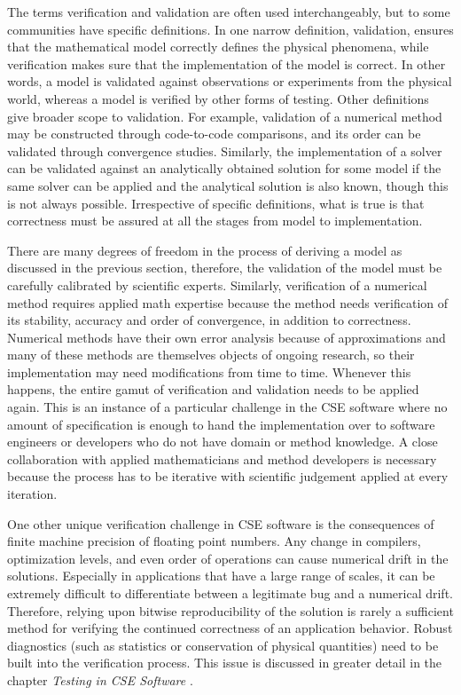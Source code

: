 The terms verification and
validation are often used interchangeably, but to some communities have specific definitions.  
In one narrow definition, validation, ensures that the
mathematical model correctly defines the physical phenomena, while
verification makes sure that the implementation of the model is
correct. In other words, a model is validated against observations or
experiments from the physical world, whereas a model is verified by
other forms of testing.   Other definitions give broader scope to 
validation. For example, validation of a numerical
method may be constructed through code-to-code comparisons, and its
order can be validated through convergence studies. Similarly, the
implementation of a solver can be validated against an analytically
obtained solution for some model if the same solver can be
applied and the analytical solution is also known, though this is not
always possible.  Irrespective of  specific definitions, what is true is that
correctness must be assured at all the stages from model to
implementation.  

There are many degrees of freedom in the process of deriving a
model as discussed in the previous section, therefore, the validation of the
model must be carefully calibrated by scientific experts. Similarly,
verification of a numerical method requires applied math expertise
because the method needs verification of its stability, accuracy and
order of convergence, in addition to correctness. Numerical methods
have their own error analysis because of approximations and many of
these methods are themselves objects of ongoing research, so their
implementation may need modifications from time to time. Whenever
this happens, the entire gamut of verification and validation needs to
be applied again. This is an instance of a particular challenge in the
CSE software where no amount of specification is enough to hand the
implementation over to software engineers or developers who do not have domain or method knowledge. A close
collaboration with applied mathematicians and method developers is necessary because the process has to be iterative with
scientific judgement applied at every iteration. 

One other unique verification challenge in CSE software is the
consequences of finite machine precision of floating point
numbers. Any change in compilers, optimization levels, and even order
of operations can cause numerical drift in the solutions. Especially
in applications that have a large range of scales, it can be extremely
difficult to differentiate between a legitimate bug and a numerical
drift. Therefore, relying upon bitwise reproducibility of the solution is
rarely a sufficient method for verifying the continued correctness of
an application behavior. Robust diagnostics (such as statistics or
conservation of physical quantities) need to be built into the
verification process.  This issue is
discussed in greater detail in the chapter {\em Testing in CSE Software} .

